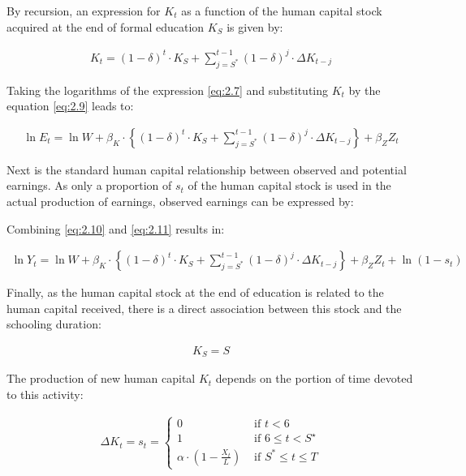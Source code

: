 \documentclass[alpha-refs]{wiley-article-02b}
\begin{document}
By recursion, an expression for $K_{t}$ as a function of the human capital stock acquired at the end of formal education $K_{S}$ is given by:

\begin{align*}\label{eq:2.9}
K_{t}=(1-\delta)^{t} \cdot K_{S}+\sum_{j=S^{*}}^{t-1}(1-\delta)^{j} \cdot \Delta K_{t-j}
\end{align*}

Taking the logarithms of the expression \ref{eq:2.7} and substituting $K_{t}$ by the equation \ref{eq:2.9} leads to:

\begin{align*}\label{eq:2.10} 
\ln E_{t}=\ln W+\beta_{K} \cdot\left\{(1-\delta)^{t} \cdot K_{S}+\sum_{j=S^{*}}^{t-1}(1-\delta)^{j} \cdot \Delta K_{t-j}\right\}+\beta_{Z} Z_{t}
\end{align*}

Next is the standard human capital relationship between observed and potential earnings. As only a proportion of $s_{t}$  of the human capital stock is  used in the actual production of earnings, observed earnings can be expressed by:


Combining \ref{eq:2.10} and \ref{eq:2.11} results in:

\begin{align*}\label{eq:2.12} 
\ln Y_{t}=\ln W+\beta_{K} \cdot\left\{(1-\delta)^{t} \cdot K_{S}+\sum_{j=S^{*}}^{t-1}(1-\delta)^{j} \cdot \Delta K_{t-j}\right\} + \beta_{Z} Z_{t} + \ln \left(1-s_{t}\right)
\end{align*}

Finally, as the human capital stock at the end of education is related to the human capital received, there is a direct association between this stock and the schooling duration:

\begin{align*}\label{eq:2.13} 
K_{S}=S
\end{align*}

The production of new human capital $K_{t}$ depends on the portion of time devoted to this activity:

\begin{align*}\label{eq:2.14} 
\Delta K_{t}=s_{t}=\left\{\begin{array}{ll}
{0} & {\text { if } t<6} \\
{1} & {\text { if } 6 \leq t<S^{\star}} \\
{\alpha \cdot\left(1-\frac{X_{t}}{L}\right)} & {\text { if } S^{*} \leq t \leq T}
\end{array}\right.
\end{align*}
\end{document}

